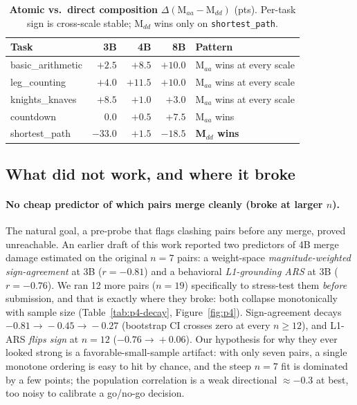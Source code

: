 \documentclass{article}
\begin{document}
\begin{table}[t]
\centering\small
\caption{\textbf{Atomic vs.\ direct composition} $\Delta(\mathrm{M}_{aa}-\mathrm{M}_{dd})$ (pts).
Per-task sign is cross-scale stable; M$_{dd}$ wins only on \texttt{shortest\_path}.}
\label{tab:p4-f28}
\begin{tabular}{lrrrl}
\toprule
Task & 3B & 4B & 8B & Pattern\\
\midrule
basic\_arithmetic & $+2.5$ & $+8.5$ & $+10.0$ & M$_{aa}$ wins at every scale\\
leg\_counting     & $+4.0$ & $+11.5$& $+10.0$ & M$_{aa}$ wins at every scale\\
knights\_knaves   & $+8.5$ & $+1.0$ & $+3.0$  & M$_{aa}$ wins at every scale\\
countdown         & $0.0$  & $+0.5$ & $+7.5$  & M$_{aa}$ wins\\
shortest\_path     & $\mathbf{-33.0}$ & $+1.5$ & $\mathbf{-18.5}$ & \textbf{M$_{dd}$ wins}\\
\bottomrule
\end{tabular}
\end{table}

\subsection{What did not work, and where it broke}
\label{sec:p4-nulls}

\paragraph{No cheap predictor of which pairs merge cleanly (broke at larger $n$).} The natural
goal, a pre-probe that flags clashing pairs before any merge, proved unreachable. An earlier draft
of this work reported two predictors of 4B merge damage estimated on the original $n{=}7$ pairs: a
weight-space \emph{magnitude-weighted sign-agreement} at 3B ($r{=}{-}0.81$) and a behavioral
\emph{L1-grounding ARS} at 3B ($r{=}{-}0.76$). We ran 12 more pairs ($n{=}19$) specifically to
stress-test them \emph{before} submission, and that is exactly where they broke: both collapse
monotonically with sample size (Table~\ref{tab:p4-decay}, Figure~\ref{fig:p4}). Sign-agreement
decays $-0.81\!\rightarrow\!-0.45\!\rightarrow\!-0.27$ (bootstrap CI crosses zero at every
$n\geq 12$), and L1-ARS \emph{flips sign} at $n{=}12$ ($-0.76\!\rightarrow\!+0.06$). Our hypothesis
for why they ever looked strong is a favorable-small-sample artifact: with only seven pairs, a
single monotone ordering is easy to hit by chance, and the steep $n{=}7$ fit is dominated by a few
points; the population correlation is a weak directional $\approx{-}0.3$ at best, too noisy to
calibrate a go/no-go decision.
\end{document}
